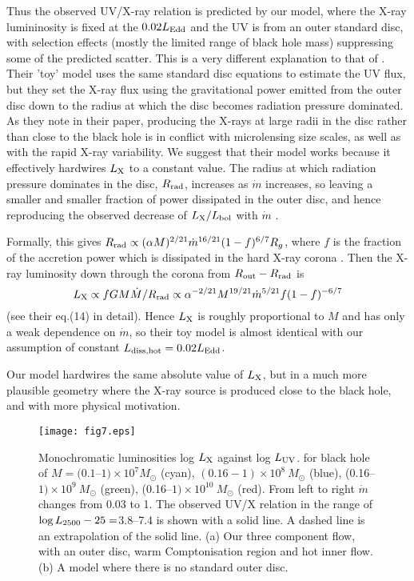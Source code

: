 \documentclass[a4paper,fleqn,usenatbib]{mnras}
\begin{document}
Thus the observed UV/X-ray relation is predicted by our model, where the
X-ray lumininosity is fixed at the $0.02L_{\rm Edd}$ and the
UV is from an outer standard disc, with selection effects (mostly the
limited range of black hole mass) suppressing
some of the predicted scatter. This is a very different explanation to
that of \cite{lusso2017}. Their 'toy' model uses the same standard
disc equations to estimate the UV flux, but they set the X-ray flux
using the gravitational power emitted from the outer disc down to the
radius at which the disc becomes radiation pressure dominated. As they
note in their paper, producing the X-rays at large radii in the disc
rather than close to the black hole is in conflict with microlensing
size scales, as well as with the rapid X-ray variability. We suggest
that their model works because it effectively hardwires $L_{\rm X}$ to a
constant value. The radius at which radiation pressure dominates in
the disc, $R_{\rm rad}$, increases as $\dot{m}$ increases, so leaving a
smaller and smaller fraction of power dissipated in the outer disc,
and hence reproducing the observed decrease of $L_{\rm X}/L_{\rm bol}$ with
$\dot{m}$ \citep{vasudevan2007}. 

Formally, this gives $R_{\rm rad} \propto (\alpha
M)^{2/21} \dot{m}^{16/21}(1-f)^{6/7} R_g$, where $f$ is the fraction
of the accretion power which is dissipated in the hard X-ray corona
\citep{svensson1994}. Then the X-ray luminosity down through the
corona from $R_{\rm out}-R_{\rm rad}$ is 
\[L_{\rm X}\propto fGM\dot{M}/R_{\rm rad}\propto
\alpha^{-2/21}M^{19/21}\dot{m}^{5/21}f(1-f)^{-6/7}
\] (see their eq.(14) in detail).  Hence $L_{\rm X}$ is roughly
proportional to $M$ and has only a weak dependence on
$\dot{m}$, so their toy model is almost identical with our
assumption of constant $L_{\rm diss,hot}=0.02 L_{\rm Edd}$.
 
Our model hardwires the same absolute value of $L_{\rm X}$, but in a much
more plausible geometry where the X-ray source is produced close to
the black hole, and with more physical motivation.

\begin{figure*}
\texttt{[image: fig7.eps]}
    \caption{Monochromatic luminosities log $L_{\rm X}$ against log $L_{\rm UV}$. 
   for black hole of $M=(0.1$--$1)\times10^7M_\odot$ (cyan), $(0.16-1)\times 10^8~M_\odot$ (blue), 
   (0.16--$1)\times 10^9~M_\odot$ (green), 
   (0.16--$1)\times 10^{10}~M_\odot$ (red). 
   From left to right $\dot{m}$ changes from 0.03 to 1.
    The observed UV/X relation in the range of $\log L_{\rm
      2500}-25=$3.8--7.4\citep[Fig. 3]{lusso2017} is shown with a
    solid line. A dashed line is an extrapolation of the solid line.
(a) Our three component flow, with an outer disc,
warm Comptonisation region and hot inner flow. (b) A
model where there is no standard outer disc. 
}
    \label{fig:uv-x}
\end{figure*}
\end{document}
